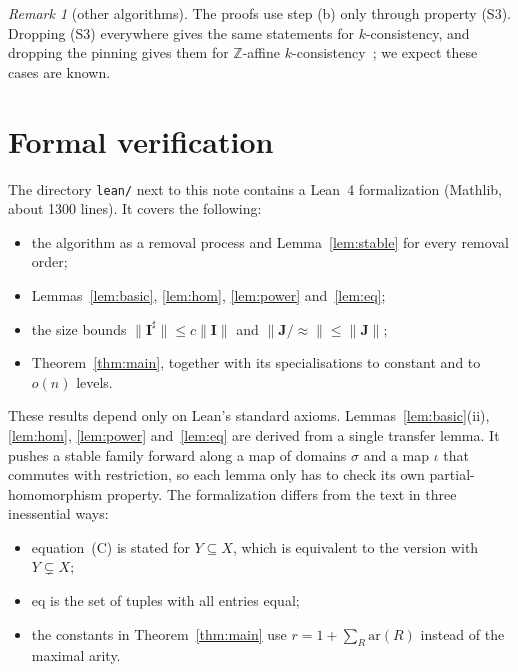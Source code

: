\documentclass[11pt]{article}
\theoremstyle{definition}
\theoremstyle{remark}
\newtheorem{remark}[theorem]{Remark}
\newcommand{\eqrel}{\mathrm{eq}}
\newcommand{\size}[1]{\lVert #1\rVert}
\begin{document}
\begin{remark}[other algorithms]
The proofs use step (b) only through property (S3). Dropping (S3) everywhere
gives the same statements for $k$-consistency, and dropping the pinning gives
them for $\mathbb Z$-affine $k$-consistency~\cite{DO24}; we expect these cases
are known.
\end{remark}

\section{Formal verification}\label{sec:lean}

The directory \texttt{lean/} next to this note contains a Lean~4 formalization
(Mathlib, about 1300 lines). It covers the following:
\begin{itemize}
\item the algorithm as a removal process and Lemma~\ref{lem:stable} for every
  removal order;
\item Lemmas~\ref{lem:basic}, \ref{lem:hom}, \ref{lem:power} and~\ref{lem:eq};
\item the size bounds $\size{\mathbf I^\sharp}\le c\size{\mathbf I}$ and
  $\size{\mathbf J/{\approx}}\le\size{\mathbf J}$;
\item Theorem~\ref{thm:main}, together with its specialisations to constant
  and to $o(n)$ levels.
\end{itemize}
These results depend only on Lean's standard axioms. Lemmas~\ref{lem:basic}(ii),
\ref{lem:hom}, \ref{lem:power} and~\ref{lem:eq} are derived from a single
transfer lemma. It pushes a stable family forward along a map
of domains $\sigma$ and a map $\iota$ that commutes with restriction, so each
lemma only has to check its own partial-homomorphism property.
The formalization differs from the text in three inessential ways:
\begin{itemize}
\item equation~(C) is stated for $Y\subseteq X$, which is equivalent to the
  version with $Y\subsetneq X$;
\item $\eqrel$ is the set of tuples with all entries equal;
\item the constants in Theorem~\ref{thm:main} use $r=1+\sum_R\mathrm{ar}(R)$
  instead of the maximal arity.
\end{itemize}
\end{document}
